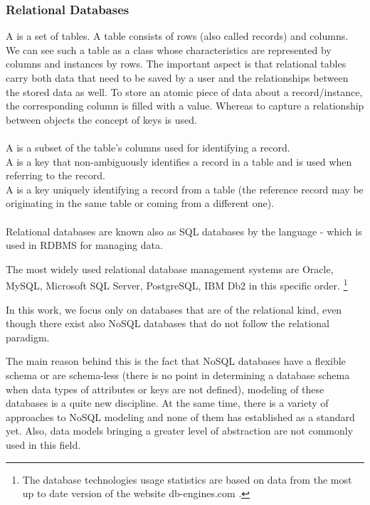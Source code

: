 \subsubsection{Relational Databases}
\label{relational_databases}
A  is a set of tables. A table consists of rows (also called records) and columns. We can see such a table as a class whose characteristics are represented by columns and instances by rows.
The important aspect is that relational tables carry both data that need to be saved by a user and the relationships between the stored data as well. 
To store an atomic piece of data about a record/instance, the corresponding column is filled with a value.
Whereas to capture a relationship between objects the concept of keys is used. \\ \\
A  is a subset of the table's columns used for identifying a record. \\
A  is a key that non-ambiguously identifies a record in a table and is used when referring to the record. \\
A  is a key uniquely identifying a record from a table (the reference record may be originating in the same table or coming from a different one). \\ \\
Relational databases are known also as SQL databases by the language -  which is used in RDBMS for managing data.

The most widely used relational database management systems are Oracle, MySQL, Microsoft SQL Server, PostgreSQL, IBM Db2 in this specific order. \footnote{The database technologies usage statistics are based on data from the most up to date version of the website db-engines.com \cite{DatabaseEnginesStatistics19}.}

In this work, we focus only on databases that are of the relational kind, even though there exist also NoSQL databases that do not follow the relational paradigm. 

The main reason behind this is the fact that NoSQL databases have a flexible schema or are schema-less (there is no point in determining a database schema when data types of attributes or keys are not defined), modeling of these databases is a quite new discipline. At the same time, there is a variety of approaches to NoSQL modeling and none of them has established as a standard yet.
Also, data models bringing a greater level of abstraction are not commonly used in this field. \cite{NoSQLDatabaseModeling}

